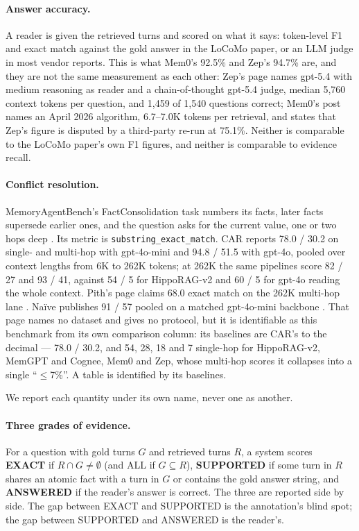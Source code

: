 \documentclass[11pt]{article}
\begin{document}
\paragraph{Answer accuracy.} A reader is given the retrieved turns and
scored on what it says: token-level F1 and exact match against the gold
answer in the LoCoMo paper, or an LLM judge in most vendor reports. This is
what Mem0's 92.5\% \cite{mem0blog} and Zep's 94.7\% \cite{zepresearch} are,
and they are not the same measurement as each other: Zep's page names
gpt-5.4 with medium reasoning as reader and a chain-of-thought gpt-5.4 judge,
median 5,760 context tokens per question, and 1,459 of 1,540 questions
correct; Mem0's post names an April 2026 algorithm, 6.7--7.0K tokens per
retrieval, and states that Zep's figure is disputed by a third-party
re-run at 75.1\%. Neither is comparable to the LoCoMo paper's own F1
figures, and neither is comparable to evidence recall.

\paragraph{Conflict resolution.} MemoryAgentBench's FactConsolidation task
numbers its facts, later facts supersede earlier ones, and the question asks
for the current value, one or two hops deep \cite{mab}. Its metric is
\texttt{substring\_exact\_match}. CAR \cite{car} reports 78.0 / 30.2 on
single- and multi-hop with gpt-4o-mini and 94.8 / 51.5 with gpt-4o, pooled
over context lengths from 6K to 262K tokens; at 262K the same pipelines score
82 / 27 and 93 / 41, against 54 / 5 for HippoRAG-v2 and 60 / 5 for gpt-4o
reading the whole context. Pith's page claims 68.0 exact match on the
262K multi-hop lane \cite{pith}. Na\"ive publishes 91 / 57 pooled on a matched
gpt-4o-mini backbone \cite{naivebrain}. That page names no dataset and gives no
protocol, but it is identifiable as this benchmark from its own comparison column:
its baselines are CAR's to the decimal --- 78.0 / 30.2, and 54, 28, 18 and 7
single-hop for HippoRAG-v2, MemGPT and Cognee, Mem0 and Zep, whose multi-hop
scores it collapses into a single ``$\le$7\%''. A table is identified by its
baselines.

We report each quantity under its own name, never one as another.

\paragraph{Three grades of evidence.} For a question with gold turns $G$ and
retrieved turns $R$, a system scores \textbf{EXACT} if $R \cap G \neq
\emptyset$ (and ALL if $G \subseteq R$), \textbf{SUPPORTED} if some turn in
$R$ shares an atomic fact with a turn in $G$ or contains the gold answer
string, and \textbf{ANSWERED} if the reader's answer is correct. The three
are reported side by side. The gap between EXACT and SUPPORTED is the
annotation's blind spot; the gap between SUPPORTED and ANSWERED is the
reader's.
\end{document}
